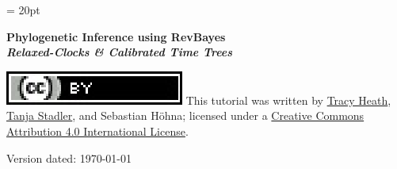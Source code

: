 \documentclass[11pt]{article}
\begin{document}
\renewcommand{\headrulewidth}{0.5pt}
\headsep = 20pt
\lhead{ }

\thispagestyle{plain}
\begin{center}

\textbf{\LARGE Phylogenetic Inference using RevBayes}\\\vspace{2mm}
\textbf{\it{\Large Relaxed-Clocks \& Calibrated Time Trees}}\\\vspace{2mm}
\end{center}



\href{http://creativecommons.org/licenses/by/4.0/}{\includegraphics[scale=0.8]{../shared_figures/ccby.eps}} This tutorial was written by \href{http://phylo.bio.ku.edu/content/tracy-heath}{Tracy Heath}, \href{http://www.bsse.ethz.ch/cevo}{Tanja Stadler}, and Sebastian H\"{o}hna; licensed under a \href{http://creativecommons.org/licenses/by/4.0/}{Creative Commons Attribution 4.0 International License}. 



Version dated: \today



\printbibliography[heading=relevref]
\end{document}
